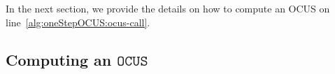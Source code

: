 \documentclass[twoside,11pt]{article}
\newcommand\comment[1]{\marginpar{\tiny #1}}
\renewcommand\comment[1]{#1}
\newcommand{\tias}[1]{{\comment{\color{blue}Tias:#1}}}
\newcommand{\emilio}[1]{{\comment{\color{red}Emilio: #1}}}
\newcommand{\bart}[1]{{\comment{\color{OliveGreen}Bart: #1}}}
\newcommand\mm[1]{\ensuremath{#1}\xspace}
\newcommand\call[1]{\mm{\texttt{#1}}}
\newcommand\comus{\mm{\call{OCUS}}}
\newcommand\onestep{\ensuremath{\call{Explain-One-Step}}\xspace}
\begin{document}
In the next section, we provide the details on how to compute an OCUS on line~\ref{alg:oneStepOCUS:ocus-call}.


\subsection{Computing an \comus}\label{sec:computing_an_ocus}

\end{document}
